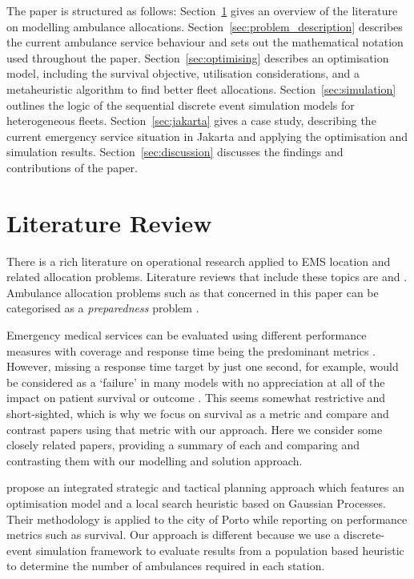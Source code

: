 \documentclass[numbers,webpdf,imaman]{ima-authoring-template}%
\begin{document}
The paper is structured as follows:
Section~\ref{sec:litreview} gives an overview of the literature on modelling
ambulance allocations.
Section~\ref{sec:problem_description} describes the current ambulance service
behaviour and sets out the mathematical notation used throughout the paper.
Section~\ref{sec:optimising} describes an
optimisation model, including the survival objective, utilisation
considerations, and a metaheuristic algorithm to find better fleet allocations.
Section~\ref{sec:simulation} outlines the logic of the sequential discrete
event simulation models for heterogeneous fleets.
Section~\ref{sec:jakarta} gives a case study, describing the current emergency
service situation in Jakarta and applying the optimisation and simulation
results.
Section~\ref{sec:discussion} discusses the findings and contributions of the
paper.



\section{Literature Review}\label{sec:litreview}
There is a rich literature on operational research applied to EMS location and
related allocation problems. Literature reviews that include these topics are
\citet{aringhieri2017emergency, belanger2019recent, farahani2019or, Li2011, Liu2021, reuter2017logistics, mukhopadhyay22}
and \citet{wang2021emergency}. Ambulance allocation problems such as that
concerned in this paper can be categorised as a \textit{preparedness}
problem \citep{mukhopadhyay22}.

Emergency medical services can be evaluated using different performance
measures with coverage and response time being the predominant metrics
\citep{Mclay2010evaluating}. However, missing a response time target by just
one second, for example, would be considered as a `failure' in many models
with no appreciation at all of the impact on patient survival or outcome
\citep{Mclay2010evaluating}. This seems somewhat restrictive and short-sighted,
which is why we focus on survival as a metric and
compare and contrast papers using that metric with our approach.
Here we consider some closely related papers, providing a summary of each and
comparing and contrasting them with our modelling and solution approach.

\citet{amorim2019integrated} propose an integrated strategic and tactical
planning approach which features an optimisation model and a local search
heuristic based on Gaussian Processes. Their methodology is applied to the
city of Porto while reporting on performance metrics such as survival. Our
approach is different because we use a discrete-event simulation framework
to evaluate results from a population based heuristic to determine the number of
ambulances required in each station. 
\end{document}

